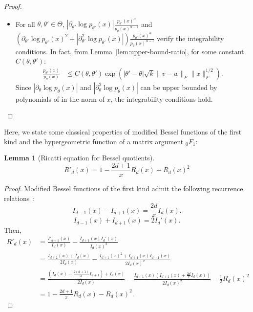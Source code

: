 \documentclass{article}
\theoremstyle{plain}
\newtheorem{lemma}{Lemma}[section]
\theoremstyle{definition}
\theoremstyle{remark}
\begin{document}
\begin{proof}
\begin{itemize}
        \item For all $\theta, \theta' \in \Theta$, $\left|\partial_{\theta'}\log p_{\theta'}(x)\right|\frac{p_{\theta'}(x)^\alpha}{p_{\theta}(x)^{\alpha-1}}$ and $\left(\partial_{\theta'} \log p_{\theta'} (x)^2 +\left| \partial_{\theta'}^2\log p_{\theta'}(x)\right|\right)\frac{p_{\theta'}(x)^\alpha}{p_{\theta}(x)^{\alpha-1}}$ verify the integrability conditions.
        In fact, from Lemma~\ref{lem:upper-bound-ratio}, for some constant $C(\theta,\theta')$:
        \begin{align*}
            \frac{p_{\theta'}(x)}{p_{\theta}(x)} &\leq C(\theta,\theta') \exp\left( |\theta' - \theta|\sqrt{k}\|v-w\|_{F} \|x\|_F^{1/2} \right).
        \end{align*}
        Since $|\partial_\theta \log p_\theta(x)|$ and $|\partial_\theta^2 \log p_\theta(x)|$ can be upper bounded by polynomials of in the norm of $x$, the integrability conditions hold.
    \end{itemize}
\end{proof}
Here, we state some classical properties of modified Bessel functions of the first kind and the hypergeometric function of a matrix argument ${}_0F_1$:
\begin{lemma}[Ricatti equation for Bessel quotients]
\label{lem:ricatti-bessel}
    \[R'_d(x)=1 - \frac{2d +1}{x}R_d(x) - R_d(x)^2\]
\end{lemma}

\begin{proof}
    Modified Bessel functions of the first kind admit the following recurrence relations~\citep[11.115~and~11.116]{Arfken2011}:
    \[I_{d-1}(x) - I_{d+1}(x) = \frac{2d}{x}I_d(x).\]
    \[I_{d-1}(x) + I_{d+1}(x) = 2 I_d'(x).\]
    Then,
    \begin{align*}
        R'_d(x) &= \frac{I'_{d+1} (x)}{I_d(x)} - \frac{I_{d+1}(x) I_d'(x)}{I_d(x)^2}\\
        &= \frac{I_{d+2}(x) + I_d(x)}{2I_d(x)} - \frac{I_{d+1}(x)^2 + I_{d+1}(x) I_{d-1}(x)}{2I_d(x)^2}\\
        &= \frac{(I_d(x) - \frac{2(d+1)}{x} I_{d+1}) + I_d(x)}{2I_d(x)} - \frac{I_{d+1}(x) (I_{d+1}(x) + \frac{2d}{x}I_d(x))}{2I_d(x)^2} - \frac{1}{2}R_d(x)^2\\
        &= 1 - \frac{2d+1}{x} R_d(x) - R_d(x)^2.
    \end{align*}
\end{proof}
\end{document}
